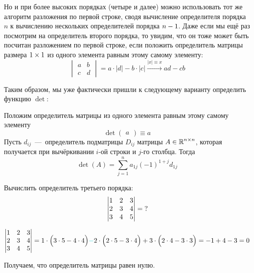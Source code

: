 \documentclass[a4paper,12pt]{article}
\begin{document}
  Но и при более высоких порядках (четыре и далее) можно использовать тот же алгоритм разложения по первой строке, сводя вычисление определителя порядка $n$ к вычислению нескольких определителей порядка $n \hm- 1$.
  Даже если мы ещё раз посмотрим на определитель второго порядка, то увидим, что он тоже может быть посчитан разложением по первой строке, если положить определитель матрицы размера $1 \hm\times 1$ из одного элемента равным этому самому элементу:
  \[
    \begin{vmatrix}
      a & b\\
      c & d
    \end{vmatrix}
    = a \cdot |d| - b \cdot |c|
    \xrightarrow{|x| \equiv x} ad - cb
  \]
  
  Таким образом, мы уже фактически пришли к следующему варианту определить функцию $\det$:
  
  \begin{definition}
    Положим определитель матрицы из одного элемента равным этому самому элементу
    \[
      \det \begin{pmatrix}a\end{pmatrix} \equiv a
    \]
    Пусть $d_{ij}$~---~определитель подматрицы $D_{ij}$ матрицы $A \in \operatorname{\mathbb R}^{n \times n}$, которая получается при вычёркивании $i$-ой строки и $j$-го столбца.
    Тогда
    \[
      \det(A) = \sum\limits_{j = 1}^n a_{1j} (-1)^{1 + j} d_{1j}
    \]
  \end{definition}
  
  \begin{problem}[14.7(6)]
    Вычислить определитель третьего порядка:
    \[
      \begin{vmatrix}
        1 & 2 & 3\\
        2 & 3 & 4\\
        3 & 4 & 5
      \end{vmatrix} = \operatorname{?}
    \]
  \end{problem}
  
  \begin{solution}
    \[
      \begin{vmatrix}
        1 & 2 & 3\\
        2 & 3 & 4\\
        3 & 4 & 5
      \end{vmatrix}
      = 1 \cdot \Bigl(3 \cdot 5 - 4 \cdot 4\Bigr)
        \textcolor{light-cyan}{-} 2 \cdot \Bigl(2 \cdot 5 - 3 \cdot 4\Bigr)
        + 3 \cdot \Bigl(2 \cdot 4 - 3 \cdot 3\Bigr)
      = -1 + 4 - 3
      = 0
    \]
    
    Получаем, что определитель матрицы равен нулю.
  \end{solution}
  
\end{document}
